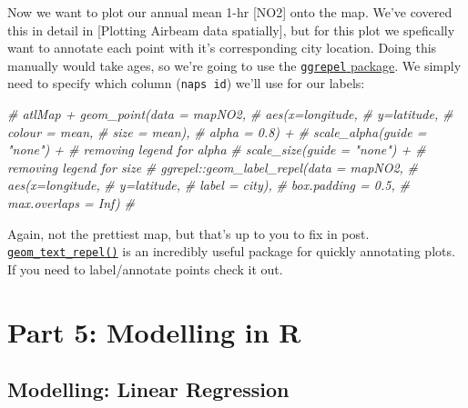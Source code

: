 \documentclass[
]{book}
\newenvironment{Shaded}{\begin{snugshade}}{\end{snugshade}}
\newcommand{\CommentTok}[1]{\textcolor[rgb]{0.56,0.35,0.01}{\textit{#1}}}
\begin{document}
Now we want to plot our annual mean 1-hr {[}NO2{]} onto the map. We've covered this in detail in {[}Plotting Airbeam data spatially{]}, but for this plot we spefically want to annotate each point with it's corresponding city location. Doing this manually would take ages, so we're going to use the \href{https://cran.r-project.org/web/packages/ggrepel/vignettes/ggrepel.html}{\texttt{ggrepel} package}. We simply need to specify which column (\texttt{naps\ id}) we'll use for our labels:

\begin{Shaded}
\begin{Highlighting}[]
\CommentTok{\# atlMap + geom\_point(data = mapNO2, }
\CommentTok{\#              aes(x=longitude,}
\CommentTok{\#                  y=latitude,}
\CommentTok{\#                  colour = mean,}
\CommentTok{\#                  size = mean),}
\CommentTok{\#              alpha = 0.8) +}
\CommentTok{\#   scale\_alpha(guide = "none") + \# removing legend for alpha}
\CommentTok{\#   scale\_size(guide = "none") + \# removing legend for size}
\CommentTok{\#   ggrepel::geom\_label\_repel(data = mapNO2, }
\CommentTok{\#                             aes(x=longitude,}
\CommentTok{\#                                 y=latitude,}
\CommentTok{\#                                 label = city),}
\CommentTok{\#                             box.padding = 0.5,}
\CommentTok{\#                             max.overlaps = Inf)}
\CommentTok{\# }
\end{Highlighting}
\end{Shaded}

Again, not the prettiest map, but that's up to you to fix in post. \href{https://ggrepel.slowkow.com/articles/examples.html}{\texttt{geom\_text\_repel()}} is an incredibly useful package for quickly annotating plots. If you need to label/annotate points check it out.

\hypertarget{part-part-5-modelling-in-r}{%
\part*{Part 5: Modelling in R}\label{part-part-5-modelling-in-r}}

\hypertarget{modelling-linear-regression}{%
\chapter{Modelling: Linear Regression}\label{modelling-linear-regression}}
\end{document}
